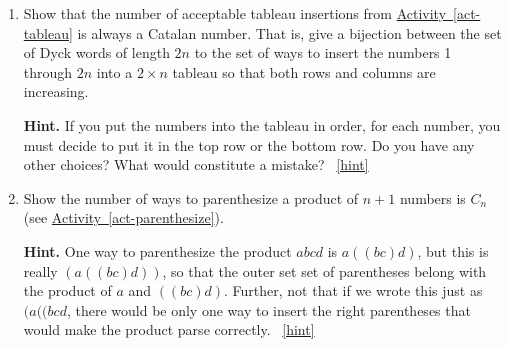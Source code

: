 \documentclass{book}
\begin{document}
\setcounter{project}{179}
\addtocounter{project}{-1}
\begin{activity}[]\label{activity-172}
\leavevmode%
\begin{enumerate}[font=\bfseries,label=(\alph*),ref=\alph*]
\item\label{task-190} \hypertarget{p-1053}{}%
Show that the number of acceptable tableau insertions from \hyperref[act-tableau]{Activity~\ref{act-tableau}} is always a Catalan number.  That is, give a bijection between the set of Dyck words of length \(2n\) to the set of ways to insert the numbers 1 through \(2n\) into a \(2\times n\) tableau so that both rows and columns are increasing.%
\par\smallskip%
\noindent\textbf{Hint.}\hypertarget{hint-118}{}\quad%
\hypertarget{p-1054}{}%
If you put the numbers into the tableau in order, for each number, you must decide to put it in the top row or the bottom row.  Do you have any other choices?  What would constitute a mistake?%
~\hfill{\tiny\hyperlink{a-179.a}{[hint]}\hypertarget{q-179.a}{}}\item\label{task-191} \hypertarget{p-1055}{}%
Show the number of ways to parenthesize a product of \(n+1\) numbers is \(C_n\) (see \hyperref[act-parenthesize]{Activity~\ref{act-parenthesize}}).%
\par\smallskip%
\noindent\textbf{Hint.}\hypertarget{hint-119}{}\quad%
\hypertarget{p-1056}{}%
One way to parenthesize the product \(abcd\) is \(a((bc)d)\), but this is really \((a((bc)d))\), so that the outer set set of parentheses belong with the product of \(a\) and \(((bc)d)\).  Further, not that if we wrote this just as \((a((bcd\), there would be only one way to insert the right parentheses that would make the product parse correctly.%
~\hfill{\tiny\hyperlink{a-179.b}{[hint]}\hypertarget{q-179.b}{}}\end{enumerate}
\end{activity}
\end{document}
